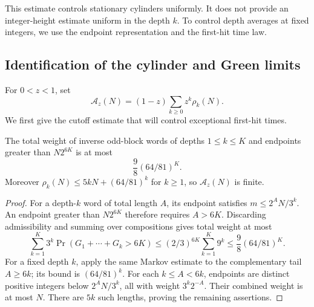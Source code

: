 This estimate controls stationary cylinders uniformly. It does not
provide an integer-height estimate uniform in the depth \(k\).
To control depth averages at fixed integers, we use the endpoint
representation and the first-hit time law.

\subsection{Identification of the cylinder and Green limits}

For \(0<z<1\), set
\[
 \mathcal A_z(N)=(1-z)\sum_{k\ge0}z^k\rho_k(N).
\]
We first give the cutoff estimate that will control exceptional
first-hit times.

\begin{lemma}\label{lem:ct-endpoint-tail}
The total weight of inverse odd-block words of depths
\(1\le k\le K\) and endpoints greater than \(N2^{6K}\) is at most
\begin{equation}\label{eq:ct-endpoint-tail}
 \frac98(64/81)^K.
\end{equation}
Moreover \(\rho_k(N)\le5kN+(64/81)^k\) for \(k\ge1\), so
\(\mathcal A_z(N)\) is finite.
\end{lemma}
\begin{proof}
For a depth-\(k\) word of total length \(A\), its endpoint
satisfies \(m\le2^AN/3^k\). An endpoint greater than \(N2^{6K}\)
therefore requires \(A>6K\). Discarding admissibility and summing
over compositions gives total weight at most
\[
 \sum_{k=1}^K3^k\Pr(G_1+\cdots+G_k>6K)
 \le(2/3)^{6K}\sum_{k=1}^K9^k
 \le\frac98(64/81)^K.
\]
For a fixed depth \(k\), apply the same Markov estimate to
the complementary tail \(A\ge6k\); its bound is
\((64/81)^k\). For each
\(k\le A<6k\), endpoints are distinct positive integers below
\(2^AN/3^k\), all with weight \(3^k2^{-A}\). Their combined
weight is at most \(N\). There are \(5k\) such lengths, proving
the remaining assertions.
\end{proof}

